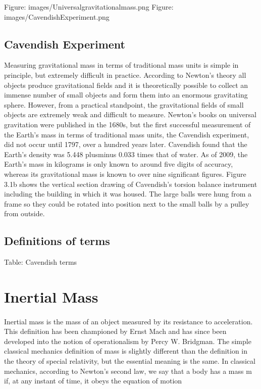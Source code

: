 \documentclass{book}
\begin{document}
Figure: images/Universalgravitationalmass.png
Figure: images/CavendishExperiment.png

\subsection{Cavendish Experiment}
Measuring gravitational mass in terms of traditional mass units is simple in principle, but extremely difficult in practice. According to Newton's theory all objects produce gravitational fields and it is theoretically possible to collect an immense number of small objects and form them into an enormous gravitating sphere. However, from a practical standpoint, the gravitational fields of small objects are extremely weak and difficult to measure. Newton's books on universal gravitation were published in the 1680s, but the first successful measurement of the Earth's mass in terms of traditional mass units, the Cavendish experiment, did not occur until 1797, over a hundred years later. Cavendish found that the Earth's density was 5.448 plusminus 0.033 times that of water. As of 2009, the Earth's mass in kilograms is only known to around five digits of accuracy, whereas its gravitational mass is known to over nine significant figures.  Figure 3.1b shows the vertical section drawing of Cavendish's torsion balance instrument including the building in which it was housed. The large balls were hung from a frame so they could be rotated into position next to the small balls by a pulley from outside.

\subsection{Definitions of terms}
Table: Cavendish terms

\section{Inertial Mass}
\paragraph{}
Inertial mass is the mass of an object measured by its resistance to acceleration. This definition has been championed by Ernst Mach and has since been developed into the notion of operationalism by Percy W. Bridgman. The simple classical mechanics definition of mass is slightly different than the definition in the theory of special relativity, but the essential meaning is the same. In classical mechanics, according to Newton's second law, we say that a body has a mass m if, at any instant of time, it obeys the equation of motion
\end{document}

